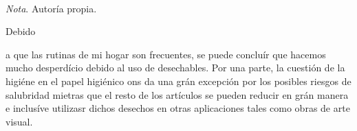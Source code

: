 \documentclass[stu, 12pt, letterpaper, donotrepeattitle, floatsintext, natbib]{apa7}
\begin{document}
\begin{table}[H]
\begin{tabular}{lllll}
\end{tabular}
\bigskip
  \\\small\textit{Nota}. Autoría propia. %
\end{table}
Debido \begin{justifying}
  a que las rutinas de mi hogar son frecuentes, se puede concluír que hacemos mucho desperdício debido al uso de 
desechables. Por una parte, la cuestión de la higiéne en el papel higiénico ons da una grán excepción por los posibles riesgos de salubridad mietras
que el resto de los artículos se pueden reducir en grán manera e inclusíve utilizasr dichos desechos en otras aplicaciones tales como obras de arte visual.\par
\end{justifying} 

\newpage
\setcounter{secnumdepth}{0} %
\renewcommand\refname{\textbf{Referencias}}
\end{document}
